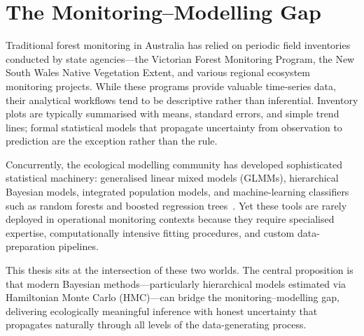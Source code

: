 \section{The Monitoring–Modelling Gap}

Traditional forest monitoring in Australia has relied on periodic field
inventories conducted by state agencies—the Victorian Forest Monitoring
Program, the New South Wales Native Vegetation Extent, and various regional
ecosystem monitoring projects. While these programs provide valuable
time-series data, their analytical workflows tend to be descriptive rather
than inferential. Inventory plots are typically summarised with means,
standard errors, and simple trend lines; formal statistical models that
propagate uncertainty from observation to prediction are the exception
rather than the rule.

Concurrently, the ecological modelling community has developed sophisticated
statistical machinery: generalised linear mixed models (GLMMs), hierarchical
Bayesian models, integrated population models, and machine-learning classifiers
such as random forests and boosted regression trees~\cite{elith2009}. Yet
these tools are rarely deployed in operational monitoring contexts because they
require specialised expertise, computationally intensive fitting procedures,
and custom data-preparation pipelines.

This thesis sits at the intersection of these two worlds. The central
proposition is that modern Bayesian methods—particularly hierarchical models
estimated via Hamiltonian Monte Carlo (HMC)—can bridge the monitoring–modelling
gap, delivering ecologically meaningful inference with honest uncertainty that
propagates naturally through all levels of the data-generating process.


